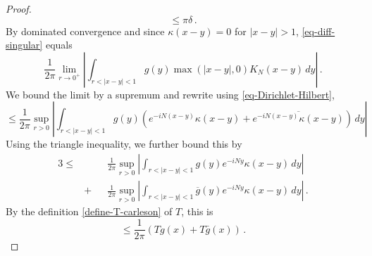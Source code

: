 \begin{proof}
\begin{equation*}
        \le \pi\delta \,.
    \end{equation*}
    By dominated convergence and since $\kappa(x-y) = 0$ for $|x-y| > 1$, \eqref{eq-diff-singular} equals
    \begin{equation*}
        \frac{1}{2\pi} \lim_{r \to 0^+} \left| \int_{r < |x-y| < 1} g(y) \max(|x-y|,0) K_N(x-y) \, dy\right|\,.
    \end{equation*}
    We bound the limit by a supremum and rewrite using \eqref{eq-Dirichlet-Hilbert},
    \begin{equation*}
        \le \frac{1}{2\pi} \sup_{r > 0} \left| \int_{r < |x-y| < 1} g(y) \left(e^{-iN(x-y)}\kappa(x-y) + \overline{e^{-iN(x-y)}\kappa(x-y)}\right) \, dy\right|
    \end{equation*}
    Using the triangle inequality, we further bound this by
    \begin{alignat*}{3}
        \le&&&\frac{1}{2\pi} \sup_{r > 0} \left| \int_{r < |x-y| < 1} g(y) e^{-iNy} \kappa(x-y) \, dy\right| \\
        &+ &&\frac{1}{2\pi} \sup_{r > 0} \left| \int_{r < |x-y| < 1} \overline{g}(y) e^{-iNy} \kappa(x-y) \, dy\right|\,.
    \end{alignat*}
    By the definition \eqref{define-T-carleson} of $T$, this is
    \begin{equation*}
        \le \frac{1}{2\pi} (Tg(x) + T\bar{g}(x))\,.
    \end{equation*}
\end{proof}

